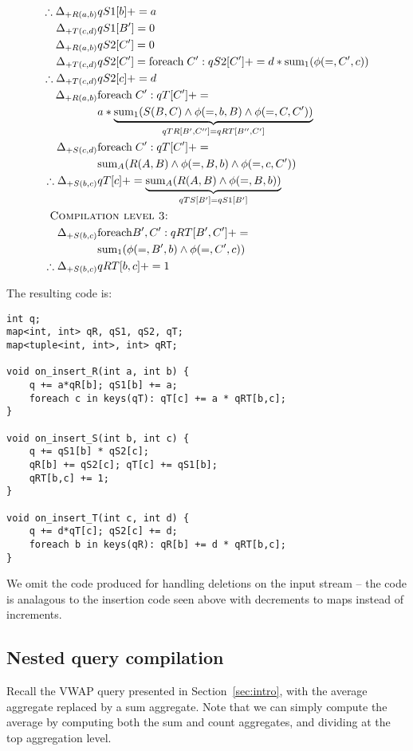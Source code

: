 \begin{example}
\begin{align*}
\therefore \Delta_{+R(a,b)} & qS1[b] += a \\
\Delta_{+T(c,d)} & qS1[B'] = 0 \\
\Delta_{+R(a,b)} & qS2[C'] = 0 \\
\Delta_{+T(c,d)} & qS2[C'] = \algforeach \; C': qS2[C'] +=
d * \algsum_{1}(\phi(=,C',c))
\\
\therefore \Delta_{+T(c,d)} & qS2[c] += d\\
\Delta_{+R(a,b)} & \algforeach \; C': qT[C'] += \\
& a * \underbrace{\algsum_{1}(S(B,C) \wedge \phi(=,b,B) \wedge
  \phi(=,C,C'))}_{qTR[B',C''] = qRT[B'',C']}
\\
\Delta_{+S(c,d)} & \algforeach \; C': qT[C'] += \\
& \algsum_{A}(R(A,B) \wedge \phi(=,B,b) \wedge \phi(=,c,C'))\\
\therefore \Delta_{+S(b,c)} & qT[c] +=
\underbrace{\algsum_{A}(R(A,B) \wedge \phi(=,B,b))}_{qTS[B'] = qS1[B']}
\\
& \hspace{-1.5cm}\mbox{\sc Compilation level 3:}\\
\Delta_{+S(b,c)} & \algforeach B',C': qRT[B',C'] += \\
& \algsum_{1}(\phi(=,B',b) \wedge \phi(=,C',c))
\\
\therefore \Delta_{+S(b,c)} & qRT[b,c] += 1
\end{align*}
\end{example}

\noindent The resulting code is:

\begin{Verbatim}
int q;
map<int, int> qR, qS1, qS2, qT;
map<tuple<int, int>, int> qRT;

void on_insert_R(int a, int b) {
    q += a*qR[b]; qS1[b] += a;
    foreach c in keys(qT): qT[c] += a * qRT[b,c];
}

void on_insert_S(int b, int c) {
    q += qS1[b] * qS2[c];
    qR[b] += qS2[c]; qT[c] += qS1[b];
    qRT[b,c] += 1;
}

void on_insert_T(int c, int d) {
    q += d*qT[c]; qS2[c] += d;
    foreach b in keys(qR): qR[b] += d * qRT[b,c];
}
\end{Verbatim}

We omit the code produced for handling deletions on the input stream -- the code
is analagous to the insertion code seen above with decrements to maps instead of
increments.


\subsection{Nested query compilation}
Recall the VWAP query presented in Section~\ref{sec:intro}, with the average
aggregate replaced by a sum aggregate. Note that we can simply compute the
average by computing both the sum and count aggregates, and dividing at the top
aggregation level.

